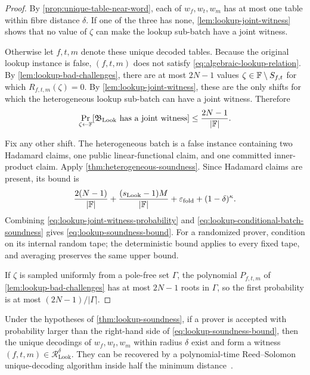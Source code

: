 \begin{proof}
By \cref{prop:unique-table-near-word}, each of $w_f,w_t,w_m$ has at most one table within fibre distance $\delta$.  If one of the three has none, \cref{lem:lookup-joint-witness} shows that no value of $\zeta$ can make the lookup sub-batch have a joint witness.

Otherwise let $f,t,m$ denote these unique decoded tables.  Because the original lookup instance is false, $(f,t,m)$ does not satisfy \eqref{eq:algebraic-lookup-relation}.  By \cref{lem:lookup-bad-challenges}, there are at most $2N-1$ values $\zeta\in\mathbb{F}\setminus S_{f,t}$ for which $R_{f,t,m}(\zeta)=0$.  By \cref{lem:lookup-joint-witness}, these are the only shifts for which the heterogeneous lookup sub-batch can have a joint witness.  Therefore
\begin{equation}
  \Pr_{\zeta\leftarrow\mathbb{F}}
  [\mathfrak B_{\mathrm{Look}}\text{ has a joint witness}]
  \le\frac{2N-1}{|\mathbb{F}|}.
  \label{eq:lookup-joint-witness-probability}
\end{equation}

Fix any other shift.  The heterogeneous batch is a false instance containing two Hadamard claims, one public linear-functional claim, and one committed inner-product claim.  Apply \cref{thm:heterogeneous-soundness}.  Since Hadamard claims are present, its bound is
\begin{equation}
  \frac{2(N-1)}{|\mathbb{F}|}
  +\frac{(s_{\mathrm{Look}}-1)M}{|\mathbb{F}|}
  +\varepsilon_{\mathrm{fold}}
  +(1-\delta)^\kappa.
  \label{eq:lookup-conditional-batch-soundness}
\end{equation}
Combining \eqref{eq:lookup-joint-witness-probability} and \eqref{eq:lookup-conditional-batch-soundness} gives \eqref{eq:lookup-soundness-bound}.  For a randomized prover, condition on its internal random tape; the deterministic bound applies to every fixed tape, and averaging preserves the same upper bound.

If $\zeta$ is sampled uniformly from a pole-free set $\Gamma$, the polynomial $P_{f,t,m}$ of \cref{lem:lookup-bad-challenges} has at most $2N-1$ roots in $\Gamma$, so the first probability is at most $(2N-1)/|\Gamma|$.
\end{proof}

\begin{corollary}
\label{cor:lookup-knowledge}
Under the hypotheses of \cref{thm:lookup-soundness}, if a prover is accepted with probability larger than the right-hand side of \eqref{eq:lookup-soundness-bound}, then the unique decodings of $w_f,w_t,w_m$ within radius $\delta$ exist and form a witness $(f,t,m)\in\mathcal R^{\delta}_{\mathrm{Look}}$.  They can be recovered by a polynomial-time Reed--Solomon unique-decoding algorithm inside half the minimum distance~\cite{WelchBerlekamp86,Gao03}.
\end{corollary}

